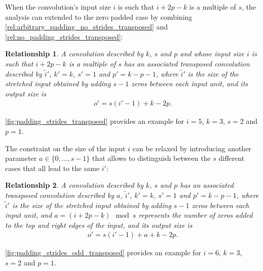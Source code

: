 \documentclass[notitlepage]{report}
\newtheorem{relationship}{Relationship}
\begin{document}
When the convolution's input size $i$ is such that $i + 2p - k$ is a multiple
of $s$, the analysis can extended to the zero padded case by combining
\autoref{rel:arbitrary_padding_no_strides_transposed} and
\autoref{rel:no_padding_strides_transposed}:

\begin{relationship}\label{rel:padding_strides_transposed}
A convolution described by $k$, $s$ and $p$ and whose
input size $i$ is such that $i + 2p - k$ is a multiple of $s$ has an associated
transposed convolution described by $\tilde{i}'$, $k' = k$, $s' = 1$ and
$p' = k - p - 1$, where $\tilde{i}'$ is the size of the stretched input
obtained by adding $s - 1$ zeros between each input unit, and its output size
is
\begin{equation*}
\begin{split}
    o' = s (i' - 1) + k - 2p.
\end{split}
\end{equation*}
\end{relationship}

\autoref{fig:padding_strides_transposed} provides an example for $i = 5$, $k =
3$, $s = 2$ and $p = 1$.

The constraint on the size of the input $i$ can be relaxed by introducing
another parameter $a \in \{0, \ldots, s - 1\}$ that allows to distinguish
between the $s$ different cases that all lead to the same $i'$:

\begin{relationship}\label{rel:padding_strides_transposed_odd}
A convolution described by $k$, $s$ and $p$ has an
associated transposed convolution described by $a$, $\tilde{i}'$, $k' = k$, $s'
= 1$ and $p' = k - p - 1$, where $\tilde{i}'$ is the size of the stretched
input obtained by adding $s - 1$ zeros between each input unit, and $a = (i +
2p - k) \mod s$ represents the number of zeros added to the top and right edges
of the input, and its output size is
\begin{equation*}
\begin{split}
    o' = s (i' - 1) + a + k - 2p.
\end{split}
\end{equation*}
\end{relationship}

\autoref{fig:padding_strides_odd_transposed} provides an example for $i = 6$, $k
= 3$, $s = 2$ and $p = 1$.
\end{document}
